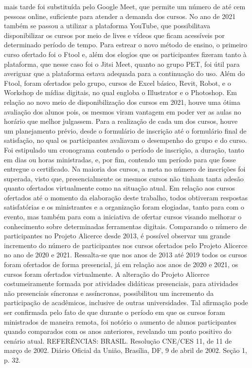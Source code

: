 mais tarde foi substituída pelo Google Meet, que permite um número de até cem pessoas online, 
suficiente para atender a demanda dos cursos. No ano de 2021 também se passou a utilizar a 
plataforma YouTube, que possibilitava disponibilizar os cursos por meio de lives e vídeos que 
ficam acessíveis por determinado período de tempo.
Para estrear o novo método de ensino, o primeiro curso ofertado foi o Ftool e, além dos 
elogios que os participantes fizeram tanto à plataforma, que nesse caso foi o Jitsi Meet, quanto ao 
grupo PET, foi útil para averiguar que a plataforma estava adequada para a continuação do uso. 
Além do Ftool, foram ofertados pelo grupo, cursos de Excel básico, Revit, Robot, e o Workshop 
de mídias digitais, no qual engloba o Illustrator e o Photoshop. Em relação ao novo meio de 
disponibilização dos cursos em 2021, houve uma ótima avaliação dos alunos pois, os mesmos 
viram vantagem em poder ver as aulas no horário que melhor julgassem.
Para a realização de cada um dos cursos, houve um planejamento prévio, desde o
formulário de inscrição até o formulário final de satisfação, no qual os participantes avaliavam o 
desempenho do grupo e do curso. Foi estipulado um cronograma contendo o período de inscrição, 
a duração, tanto em dias ou horas ministradas, e, por fim, contendo um período para que fosse 
entregue o certificado.
Na maioria dos cursos, a meta no número de inscrições foi superada, visto que,
presencialmente os mesmos cursos não tinham tanta adesão quanto ofertados virtualmente como 
na situação atual. Em relação aos cursos ofertados até o momento da elaboração deste trabalho, 
todos obtiveram respostas satisfatórias e os ministrantes e a organização foram elogiadas, tanto 
para com o evento, mas também para com a iniciativa de ofertar cursos visando melhorar o 
conhecimento sobre determinadas ferramentas digitais.
Comparando o número de participantes no Projeto Alicerce desde 2013, é possível observar 
um grande incremento do número de participantes nos cursos ofertados pelo Projeto Alicerce no 
ano de 2020 e 2021. Ressalta-se que nos anos de 2013 até 2019 todos os cursos foram ofertados 
de forma presencial, já em relação aos anos de 2020 e 2021, os cursos foram ofertados 
virtualmente.
A alteração do Projeto Alicerce costumeiramente formada por atividades didáticas
presenciais, para atividades não presenciais síncronas e assíncronas, possibilitou um incremento 
da participação de acadêmicos, inclusive de outras universidades. Tal afirmação pode ser 
confirmada pelo fato de que durante o período em que os cursos foram ministrados de maneira 
remota, foi notório o aumento de alunos participantes quando comparados com os anos anteriores, 
revelando um ponto positivo do cenário atual.
REFERÊNCIAS: 
BRASIL. Resolução CNE/CES 11, de 11 de março de 2002. Diário Oficial da União, 
Brasília, DF, 9 de abril de 2002. Seção 1, p. 32.

